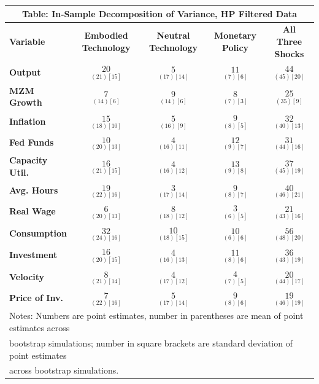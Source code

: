 \documentclass{article}
\begin{document}
 \begin{tabular}{|l|c|@{}c|c|@{}c|} 
 \hline 
 \multicolumn{5}{|c|}{\textbf{Table: In-Sample Decomposition of Variance, HP Filtered Data}} \\ \hline 
 \textbf{Variable} & \textbf{Embodied Technology} & \textbf{Neutral Technology} & \textbf{%
 Monetary Policy} & \textbf{All Three Shocks} \\ \hline\hline 
 \textbf{Output} & $\underset{( 21)[ 15]}{ 20}$ & $\underset{( 17)[ 14]}{  5}$ & $\underset{(  7)[  6]}{ 11}$ & $\underset{( 45)[ 20]}{ 44}$ \\ \hline 
 \textbf{MZM Growth} & $\underset{( 14)[  6]}{  7}$ & $\underset{( 14)[  6]}{  9}$ & $\underset{(  7)[  3]}{  8}$ & $\underset{( 35)[  9]}{ 25}$ \\ \hline 
 \textbf{Inflation} & $\underset{( 18)[ 10]}{ 15}$ & $\underset{( 16)[  9]}{  5}$ & $\underset{(  8)[  5]}{  9}$ & $\underset{( 40)[ 13]}{ 32}$ \\ \hline 
 \textbf{Fed Funds} & $\underset{( 20)[ 13]}{ 10}$ & $\underset{( 16)[ 11]}{  4}$ & $\underset{(  9)[  7]}{ 12}$ & $\underset{( 44)[ 16]}{ 31}$ \\ \hline 
 \textbf{Capacity Util.} & $\underset{( 21)[ 15]}{ 16}$ & $\underset{( 16)[ 12]}{  4}$ & $\underset{(  9)[  8]}{ 13}$ & $\underset{( 45)[ 19]}{ 37}$ \\ \hline 
 \textbf{Avg. Hours} & $\underset{( 22)[ 16]}{ 19}$ & $\underset{( 17)[ 14]}{  3}$ & $\underset{(  8)[  7]}{  9}$ & $\underset{( 46)[ 21]}{ 40}$ \\ \hline 
 \textbf{Real Wage} & $\underset{( 20)[ 13]}{  6}$ & $\underset{( 18)[ 12]}{  8}$ & $\underset{(  6)[  5]}{  3}$ & $\underset{( 43)[ 16]}{ 21}$ \\ \hline 
 \textbf{Consumption} & $\underset{( 24)[ 16]}{ 32}$ & $\underset{( 18)[ 15]}{ 10}$ & $\underset{(  6)[  6]}{ 10}$ & $\underset{( 48)[ 20]}{ 56}$ \\ \hline 
 \textbf{Investment} & $\underset{( 20)[ 15]}{ 16}$ & $\underset{( 16)[ 13]}{  4}$ & $\underset{(  8)[  6]}{ 11}$ & $\underset{( 43)[ 19]}{ 36}$ \\ \hline 
 \textbf{Velocity} & $\underset{( 21)[ 14]}{  8}$ & $\underset{( 17)[ 12]}{  4}$ & $\underset{(  7)[  5]}{  4}$ & $\underset{( 44)[ 17]}{ 20}$ \\ \hline 
 \textbf{Price of Inv.} & $\underset{( 22)[ 16]}{  7}$ & $\underset{( 17)[ 14]}{  5}  $ & $\underset{(  8)[  6]}{  9}$ & $\underset{( 46)[ 19]}{ 19}$ \\ \hline 
 \multicolumn{5}{|l|}{Notes: Numbers are point estimates, number in 
 parentheses are mean of point estimates across} \\ \hline 
 \multicolumn{5}{|l|}{bootstrap simulations; number in square brackets are 
 standard deviation of point estimates} \\ \hline 
 \multicolumn{5}{|l|}{across bootstrap simulations.} \\ \hline 
 \end{tabular} 
\end{document}
